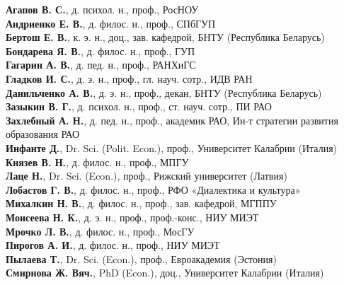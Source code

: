 \begin{minipage}[t]{.48\textwidth}
\begin{flushleft}
\vspace{1em}
\textbf{Агапов В. С.}, д. психол. н., проф., РосНОУ\\
\textbf{Андриенко Е. В.}, д. филос. н., проф., СПбГУП\\
\textbf{Бертош Е. В.}, к. э. н., доц., зав. кафедрой, БНТУ
(Республика Беларусь)\\
\textbf{Бондарева Я. В.}, д. филос. н., проф., ГУП\\
\textbf{Гагарин А. В.}, д. пед. н., проф., РАНХиГС\\
\textbf{Гладков И. С.}, д. э. н., проф., гл. науч. сотр., ИДВ РАН\\
\textbf{Данильченко А. В.}, д. э. н., проф., декан, БНТУ
(Республика Беларусь)\\
\textbf{Зазыкин В. Г.}, д. психол. н., проф., ст. науч. сотр.,
ПИ РАО\\
\textbf{Захлебный А. Н.}, д. пед. н., проф., академик РАО,
Ин-т стратегии развития образования РАО\\
\textbf{Инфанте Д.}, Dr. Sci. (Polit. Econ.), проф.,
Университет Калабрии (Италия)\\
\textbf{Князев В. Н.}, д. филос. н., проф., МПГУ\\
\textbf{Лаце Н.}, Dr. Sci. (Econ.), проф.,
Рижский университет (Латвия)\\
\textbf{Лобастов Г. В.}, д. филос. н., проф.,
РФО «Диалектика и культура»\\
\textbf{Михалкин Н. В.}, д. филос. н., проф., зав. кафедрой,
МГППУ\\
\textbf{Моисеева Н. К.}, д. э. н., проф., проф.-конс., НИУ МИЭТ\\
\textbf{Мрочко Л. В.}, д. филос. н., проф., МосГУ\\
\textbf{Пирогов А. И.}, д. филос. н., проф., НИУ МИЭТ\\
\textbf{Пылаева Т.}, Dr. Sci. (Econ.), проф., Евроакадемия
(Эстония)\\
\textbf{Смирнова Ж. Вяч.}, PhD (Econ.), доц.,
Университет Калабрии (Италия)
\end{flushleft}
\end{minipage}\hspace{0.04\textwidth}
